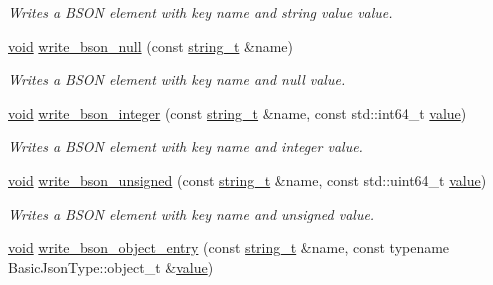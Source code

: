 \begin{DoxyCompactItemize}
\begin{DoxyCompactList}\small\item\em Writes a B\+S\+ON element with key {\itshape name} and string value {\itshape value}. \end{DoxyCompactList}\item 
\hyperlink{namespacenlohmann_1_1detail_a59fca69799f6b9e366710cb9043aa77d}{void} \hyperlink{classnlohmann_1_1detail_1_1binary__writer_a9927c1110b18661e0224a76156e5a7a9}{write\+\_\+bson\+\_\+null} (const \hyperlink{classnlohmann_1_1detail_1_1binary__writer_a29f2ae7a5c4a8c1dae47b3b2310de8a8}{string\+\_\+t} \&name)
\begin{DoxyCompactList}\small\item\em Writes a B\+S\+ON element with key {\itshape name} and null value. \end{DoxyCompactList}\item 
\hyperlink{namespacenlohmann_1_1detail_a59fca69799f6b9e366710cb9043aa77d}{void} \hyperlink{classnlohmann_1_1detail_1_1binary__writer_a553ad4dbdf27238eef90867e4bf2f3e5}{write\+\_\+bson\+\_\+integer} (const \hyperlink{classnlohmann_1_1detail_1_1binary__writer_a29f2ae7a5c4a8c1dae47b3b2310de8a8}{string\+\_\+t} \&name, const std\+::int64\+\_\+t \hyperlink{namespacenlohmann_1_1detail_a2fb6dae6578e06ae73ca0d7cc8512b1aa2063c1608d6e0baf80249c42e2be5804}{value})
\begin{DoxyCompactList}\small\item\em Writes a B\+S\+ON element with key {\itshape name} and integer {\itshape value}. \end{DoxyCompactList}\item 
\hyperlink{namespacenlohmann_1_1detail_a59fca69799f6b9e366710cb9043aa77d}{void} \hyperlink{classnlohmann_1_1detail_1_1binary__writer_a5e295ed1be6af6260d2a65f7397c3742}{write\+\_\+bson\+\_\+unsigned} (const \hyperlink{classnlohmann_1_1detail_1_1binary__writer_a29f2ae7a5c4a8c1dae47b3b2310de8a8}{string\+\_\+t} \&name, const std\+::uint64\+\_\+t \hyperlink{namespacenlohmann_1_1detail_a2fb6dae6578e06ae73ca0d7cc8512b1aa2063c1608d6e0baf80249c42e2be5804}{value})
\begin{DoxyCompactList}\small\item\em Writes a B\+S\+ON element with key {\itshape name} and unsigned {\itshape value}. \end{DoxyCompactList}\item 
\hyperlink{namespacenlohmann_1_1detail_a59fca69799f6b9e366710cb9043aa77d}{void} \hyperlink{classnlohmann_1_1detail_1_1binary__writer_a6231302930265eccb3f56c378f7b0661}{write\+\_\+bson\+\_\+object\+\_\+entry} (const \hyperlink{classnlohmann_1_1detail_1_1binary__writer_a29f2ae7a5c4a8c1dae47b3b2310de8a8}{string\+\_\+t} \&name, const typename Basic\+Json\+Type\+::object\+\_\+t \&\hyperlink{namespacenlohmann_1_1detail_a2fb6dae6578e06ae73ca0d7cc8512b1aa2063c1608d6e0baf80249c42e2be5804}{value})

\end{DoxyCompactItemize}
